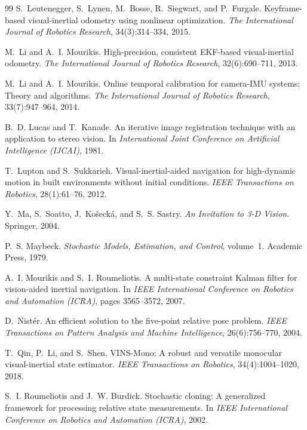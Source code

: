 \begin{thebibliography}{99}
 S.~Leutenegger, S.~Lynen, M.~Bosse, R.~Siegwart, and P.~Furgale. Keyframe-based visual-inertial odometry using nonlinear optimization. \emph{The International Journal of Robotics Research}, 34(3):314--334, 2015.

 M.~Li and A.~I. Mourikis. High-precision, consistent EKF-based visual-inertial odometry. \emph{The International Journal of Robotics Research}, 32(6):690--711, 2013.

 M.~Li and A.~I. Mourikis. Online temporal calibration for camera-IMU systems: Theory and algorithms. \emph{The International Journal of Robotics Research}, 33(7):947--964, 2014.

 B.~D. Lucas and T.~Kanade. An iterative image registration technique with an application to stereo vision. In \emph{International Joint Conference on Artificial Intelligence (IJCAI)}, 1981.

 T.~Lupton and S.~Sukkarieh. Visual-inertial-aided navigation for high-dynamic motion in built environments without initial conditions. \emph{IEEE Transactions on Robotics}, 28(1):61--76, 2012.

 Y.~Ma, S.~Soatto, J.~Ko\v{s}eck\'a, and S.~S. Sastry. \emph{An Invitation to 3-D Vision}. Springer, 2004.

 P.~S. Maybeck. \emph{Stochastic Models, Estimation, and Control}, volume~1. Academic Press, 1979.

 A.~I. Mourikis and S.~I. Roumeliotis. A multi-state constraint Kalman filter for vision-aided inertial navigation. In \emph{IEEE International Conference on Robotics and Automation (ICRA)}, pages 3565--3572, 2007.

 D.~Nist\'er. An efficient solution to the five-point relative pose problem. \emph{IEEE Transactions on Pattern Analysis and Machine Intelligence}, 26(6):756--770, 2004.

 T.~Qin, P.~Li, and S.~Shen. VINS-Mono: A robust and versatile monocular visual-inertial state estimator. \emph{IEEE Transactions on Robotics}, 34(4):1004--1020, 2018.

 S.~I. Roumeliotis and J.~W. Burdick. Stochastic cloning: A generalized framework for processing relative state measurements. In \emph{IEEE International Conference on Robotics and Automation (ICRA)}, 2002.


\end{thebibliography}
